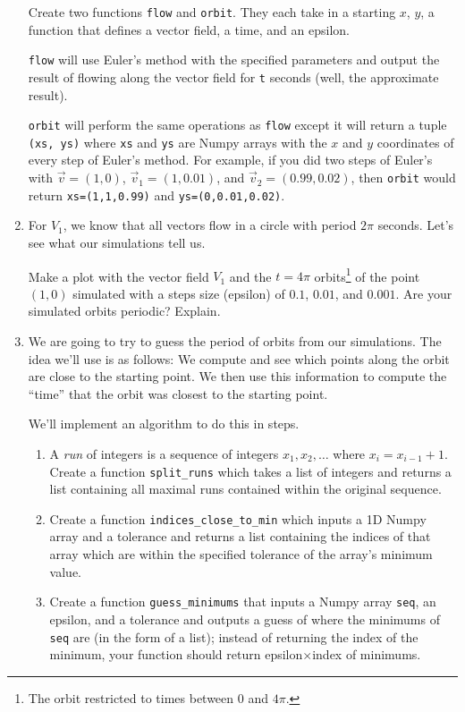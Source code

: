 \documentclass[letter]{article}
\begin{document}
\begin{enumerate}
			Create two functions {\tt flow} and {\tt orbit}. They each take in a starting $x$, $y$, a function
			that defines a vector field, a time, and an epsilon.

			{\tt flow} will use Euler's method with the specified parameters and output the result of flowing
			along the vector field for {\tt t} seconds (well, the approximate result).

			{\tt orbit} will perform the same operations as {\tt flow} except it will return a tuple \verb|(xs, ys)|
			where {\tt xs} and {\tt ys} are Numpy arrays with the $x$ and $y$ coordinates of every step of Euler's method.
			For example, if you did two steps of Euler's with $\vec v=(1,0)$, $\vec v_1=(1,0.01)$, and $\vec v_2=(0.99, 0.02)$,
			then {\tt orbit} would return {\tt xs=(1,1,0.99)} and {\tt ys=(0,0.01,0.02)}.

		\item For $V_1$, we know that all vectors flow in a circle with period $2\pi$ seconds. Let's see what our simulations
			tell us.

			Make a plot with the vector field $V_1$ and the $t=4\pi$ orbits\footnote{The orbit restricted to times between
			$0$ and $4\pi$.} of the point $(1,0)$ simulated with a steps size (epsilon) of $0.1$, $0.01$, and $0.001$. Are
			your simulated orbits periodic? Explain.

		\item We are going to try to guess the period of orbits from our simulations. The idea we'll use is as follows:
			We compute and see which points along the orbit are close to the starting point. We then use this information
			to compute the ``time'' that the orbit was closest to the starting point.

			We'll implement an algorithm to do this in steps.
			\begin{enumerate}
				\item A \emph{run} of integers is a sequence of integers $x_1,x_2,\ldots$
					where $x_i=x_{i-1}+1$. Create a function \verb|split_runs| which takes a list of integers and returns
					a list containing all maximal runs contained within the original sequence.
				\item Create a function \verb|indices_close_to_min| which inputs a 1D Numpy array and a tolerance and returns
					a list containing the indices of that array which are within the specified tolerance of the array's minimum
					value.
				\item Create a function \verb|guess_minimums| that inputs a Numpy array {\tt seq}, an epsilon, and a tolerance and
					outputs a guess of where the minimums of {\tt seq} are (in the form of a list); instead of returning the index
					of the minimum, your function should return epsilon$\times$index of minimums. 


\end{enumerate}
\end{enumerate}
\end{document}
